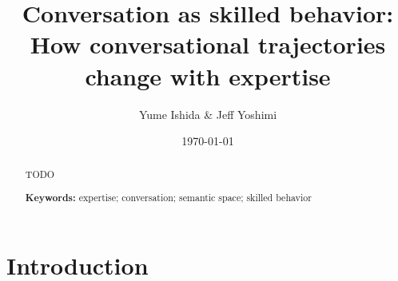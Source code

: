 \documentclass{article}
\begin{document}
\title{Conversation as skilled behavior: How conversational trajectories change with expertise}
\author{Yume Ishida \& Jeff Yoshimi}
\date{\today}
\maketitle



\begin{abstract}
TODO

\textbf{Keywords:} expertise; conversation; semantic space; skilled behavior
\end{abstract}

\section{Introduction}
\end{document}
